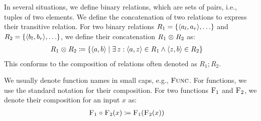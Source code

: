 In several situations, we define binary relations, which are sets of pairs, i.e., tuples of two elements.
We define the concatenation of two relations to express their transitive relation.
For two binary relations $R_1 = \setted{\tupled{a_{l}, a_{r}}, %
\dots}$ and $R_2 = \setted{\tupled{b_{l}, b_{r}}, %
\dots}$, we define their concatenation $R_1 \mathrel{\otimes} R_2$ as:
\begin{align*}
    &
    R_1 \concat R_2 \equalsperdefinition \setted{\tupled{a,b} \mid \exists z : \tupled{a,z} \in R_1 \land \tupled{z,b} \in R_2}
\end{align*}
This conforms to the composition of relations often denoted as $R_1 ; R_2$.

We usually denote function names in small caps, e.g., $\textsc{Func}$.
For functions, we use the standard notation for their composition. For two functions $\textsc{F}_{1}$ and $\textsc{F}_{2}$, we denote their composition for an input $x$ as:
\begin{align*}
    &
    \textsc{F}_{1} \mathrel{\circ} \textsc{F}_{2}(x) \coloneqq \textsc{F}_{1}(\textsc{F}_{2}(x))
\end{align*}






